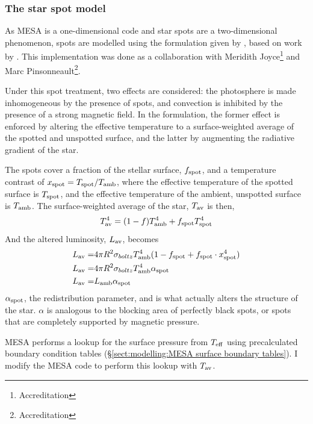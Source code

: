 \subsubsection{The star spot model}
\label{setc:modelling:star spot model description}

As MESA is a one-dimensional code and star spots are a two-dimensional phenomenon, spots are modelled using the formulation given by \citet{sommers2015}, based on work by \citet{spruit1986}.
This implementation was done as a collaboration with Meridith Joyce\footnote{Accreditation} and Marc Pinsonneault\footnote{Accreditation}.

Under this spot treatment, two effects are considered: the photosphere is made inhomogeneous by the presence of spots, and convection is inhibited by the presence of a strong magnetic field.
In the \citet{sommers2015} formulation, the former effect is enforced by altering the effective temperature to a surface-weighted average of the spotted and unspotted surface, and the latter by augmenting the radiative gradient of the star.

The spots cover a fraction of the stellar surface, $f_{\rm spot}$, and a temperature contrast of $x_{\rm spot} = T_{\rm  spot} / T_{\rm amb}$, where the effective temperature of the spotted surface is $T_{\rm spot}$, and the effective temperature of the ambient, unspotted surface is $T_{\rm amb}$. The surface-weighted average of the star, $T_{\rm av}$ is then,
\begin{equation}
    \label{eqn:modelling:surface weighted average temp}
    T_{\rm av}^4 = (1-f) T_{\rm amb}^4 + f_{\rm spot} T_{\rm spot}^4
\end{equation}
And the altered luminosity, $L_{\rm av}$, becomes
\begin{align}
    L_{\rm av} =& 4\pi R^2 \sigma_{boltz} T_{\rm amb}^4 (1 - f_{\rm spot} + f_{\rm spot} \cdot x_{\rm spot}^4) \\
    L_{\rm av} =& 4\pi R^2 \sigma_{boltz} T_{\rm amb}^4 \alpha_{\rm spot} \\
    L_{\rm av} =& L_{\rm amb} \alpha_{\rm spot}
\end{align}
$\alpha_{\rm spot}$, the redistribution parameter, and is what actually alters the structure of the star. $\alpha$ is analogous to the blocking area of perfectly black spots, or spots that are completely supported by magnetic pressure.

MESA performs a lookup for the surface pressure from $T_{\rm eff}$ using precalculated boundary condition tables (\S\ref{sect:modelling:MESA surface boundary tables}). I modify the MESA code to perform this lookup with $T_{\rm av}$.

